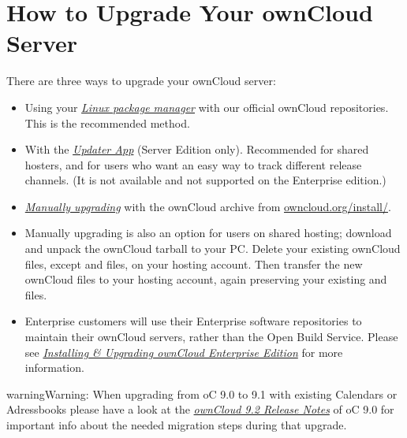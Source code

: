 \documentclass[letterpaper,10pt,english]{sphinxmanual}
\begin{document}
\section{How to Upgrade Your ownCloud Server}
\label{maintenance/upgrade:how-to-upgrade-your-owncloud-server}\label{maintenance/upgrade::doc}
There are three ways to upgrade your ownCloud server:
\begin{itemize}
\item {} 
Using your {\hyperref[maintenance/package_upgrade::doc]{\emph{Linux package manager}}} with our official
ownCloud repositories. This is the recommended method.

\item {} 
With the {\hyperref[maintenance/update::doc]{\emph{Updater App}}} (Server Edition only). Recommended for
shared hosters, and for users who want an easy way to track different
release channels. (It is not available and not supported on the Enterprise
edition.)

\item {} 
{\hyperref[maintenance/manual_upgrade::doc]{\emph{Manually upgrading}}} with the ownCloud  archive
from \href{https://owncloud.org/install/}{owncloud.org/install/}.

\item {} 
Manually upgrading is also an option for users on shared hosting; download
and unpack the ownCloud tarball to your PC. Delete your existing ownCloud
files, except  and  files, on your hosting account. Then
transfer the new ownCloud files to your hosting account, again
preserving your existing  and  files.

\item {} 
Enterprise customers will use their Enterprise software
repositories to maintain their ownCloud servers, rather than the Open Build
Service. Please see {\hyperref[enterprise_installation/linux_installation::doc]{\emph{Installing \& Upgrading ownCloud Enterprise Edition}}} for
more information.

\end{itemize}

\begin{notice}{warning}{Warning:}
When upgrading from oC 9.0 to 9.1 with existing Calendars or Adressbooks
please have a look at the {\hyperref[release_notes::doc]{\emph{ownCloud 9.2 Release Notes}}} of oC 9.0 for important info
about the needed migration steps during that upgrade.
\end{notice}
\end{document}
